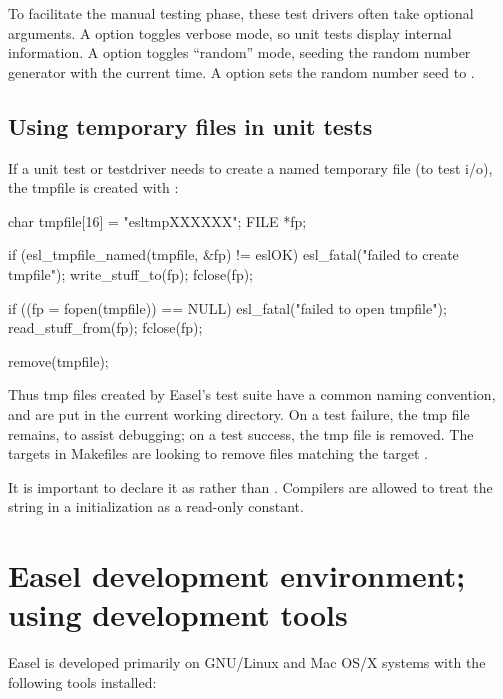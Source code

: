 To facilitate the manual testing phase, these test drivers often take
optional arguments. A  option toggles verbose mode, so unit
tests display internal information. A  option toggles
``random'' mode, seeding the random number generator with the current
time. A  option sets the random number seed to
.

\subsection{Using temporary files in unit tests}

If a unit test or testdriver needs to create a named temporary file
(to test i/o), the tmpfile is created with
:

\begin{cchunk}
   char  tmpfile[16] = "esltmpXXXXXX";
   FILE *fp;

   if (esl_tmpfile_named(tmpfile, &fp) != eslOK) esl_fatal("failed to create tmpfile");
   write_stuff_to(fp);
   fclose(fp);

   if ((fp = fopen(tmpfile)) == NULL) esl_fatal("failed to open tmpfile");
   read_stuff_from(fp);
   fclose(fp);

   remove(tmpfile);
\end{cchunk}

Thus tmp files created by Easel's test suite have a common naming
convention, and are put in the current working directory. On a test
failure, the tmp file remains, to assist debugging; on a test success,
the tmp file is removed. The  targets in Makefiles
are looking to remove files matching the target .

It is important to declare it as  rather than
. Compilers are allowed to treat the string in a
 initialization as a read-only constant.





\section{Easel development environment; using development tools}

Easel is developed primarily on GNU/Linux and Mac OS/X systems with
the following tools installed:

